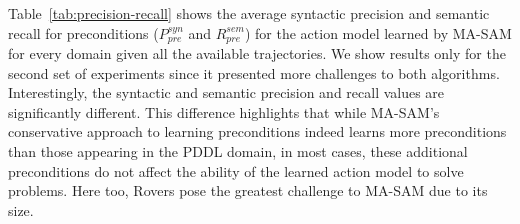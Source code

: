 \documentclass[letterpaper]{article} %
\newcommand{\pre}{\textit{pre}}
\theoremstyle{definition}
\theoremstyle{remark}
\newcommand{\masam}{\ac{MA-SAM}\xspace}
\begin{document}
Table~\ref{tab:precision-recall} shows the average syntactic precision and semantic recall for preconditions ($P^{syn}_\pre$ and $R^{sem}_\pre$) for the action model learned by \masam for every domain given all the available trajectories. We show results only for the second set of experiments since it presented more challenges to both algorithms. Interestingly, the syntactic and semantic precision and recall values are significantly different.
This difference highlights that while \masam's conservative approach to learning preconditions indeed learns more preconditions than those appearing in the PDDL domain, in most cases, these additional preconditions do not affect the ability of the learned action model to solve problems. 
Here too, Rovers pose the greatest challenge to \masam due to its size.





\end{document}
